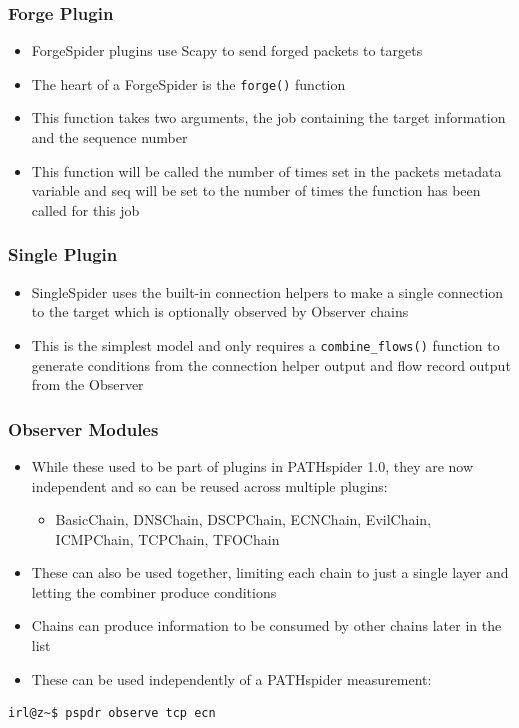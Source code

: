 \documentclass[handout,notes]{beamer}
\begin{document}
\begin{frame}
\frametitle{Forge Plugin}
\begin{itemize}[<+->]
\item{ForgeSpider plugins use Scapy to send forged packets to targets}
\item{The heart of a ForgeSpider is the \texttt{forge()} function}
\item{This function takes two arguments, the job containing the target
information and the sequence number}
\item{This function will be called the number of times set in the packets
metadata variable and seq will be set to the number of times the function has
been called for this job}
\end{itemize}
\end{frame}

\begin{frame}
\frametitle{Single Plugin}
\begin{itemize}[<+->]
\item{SingleSpider uses the built-in connection helpers to make a single
connection to the target which is optionally observed by Observer chains}
\item{This is the simplest model and only requires a \texttt{combine\_flows()}
function to generate conditions from the connection helper output and flow
record output from the Observer}
\end{itemize}
\end{frame}

\begin{frame}[fragile]
\frametitle{Observer Modules}
\begin{itemize}
\item{While these used to be part of plugins in PATHspider 1.0, they are now independent and so can be reused across multiple plugins:}
\begin{itemize}
\item{BasicChain, DNSChain, DSCPChain, ECNChain, EvilChain, ICMPChain, TCPChain, TFOChain}
\end{itemize}
\item{These can also be used together, limiting each chain to just a single layer and letting the combiner produce conditions}
\item{Chains can produce information to be consumed by other chains later in the list}
\item{These can be used independently of a PATHspider measurement:}
\end{itemize}
\begin{lstlisting}[caption={Running the PATHspider Observer independently}]
irl@z~$ pspdr observe tcp ecn
\end{lstlisting}
\end{frame}
\end{document}
